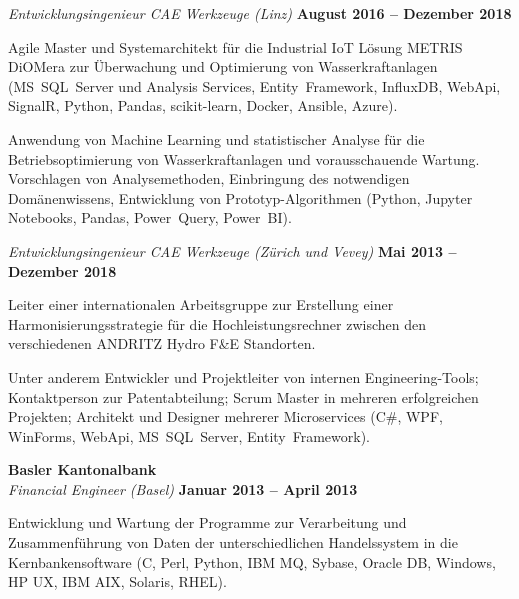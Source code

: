 \documentclass[line,11pt,a4paper]{resume}
\begin{document}
\begin{resume}
\textsl{Entwicklungsingenieur CAE Werkzeuge (Linz)}
  \hfill \textbf{August 2016 -- Dezember 2018}\\
\vspace{-4mm}%
\begin{list2}
  \item Agile Master und Systemarchitekt für die Industrial IoT Lösung METRIS
    DiOMera zur Überwachung und Optimierung von Wasserkraftanlagen
    (MS~SQL~Server und Analysis Services, Entity~Framework, InfluxDB, WebApi,
    SignalR, Python, Pandas, scikit-learn, Docker, Ansible, Azure).

  \item Anwendung von Machine Learning und statistischer Analyse für die
    Betriebsoptimierung von Wasserkraftanlagen und vorausschauende Wartung.
    Vorschlagen von Analysemethoden, Einbringung des notwendigen
    Domänenwissens, Entwicklung von Prototyp-Algorithmen (Python, Jupyter
    Notebooks, Pandas, Power~Query, Power~BI).
\end{list2}

\textsl{Entwicklungsingenieur CAE Werkzeuge (Zürich und Vevey)}
  \hfill \textbf{Mai 2013 -- Dezember 2018}\\
\vspace{-4mm}%
\begin{list2}
  \item Leiter einer internationalen Arbeitsgruppe zur Erstellung
    einer Harmonisierungsstrategie für die Hochleistungsrechner zwischen den
    verschiedenen ANDRITZ Hydro F\&E Standorten.

  \item Unter anderem Entwickler und Projektleiter von internen
    Engineering-Tools; Kontaktperson zur Patentabteilung; Scrum Master in
    mehreren erfolgreichen Projekten; Architekt und Designer mehrerer
    Microservices (C\#, WPF, WinForms, WebApi, MS~SQL~Server,
    Entity~Framework).
\end{list2}

\textbf{Basler Kantonalbank}\\\vspace{1mm}%
\textsl{Financial Engineer (Basel)}
  \hfill \textbf{Januar 2013 -- April 2013}\\
\vspace{-4mm}%
\begin{list2}
  \item Entwicklung und Wartung der Programme zur Verarbeitung und
    Zusammenführung von Daten der unterschiedlichen Handelssystem in die
    Kernbankensoftware (C, Perl, Python, IBM MQ, Sybase, Oracle DB, Windows, HP
    UX, IBM AIX, Solaris, RHEL).
\end{list2}


\end{resume}
\end{document}
